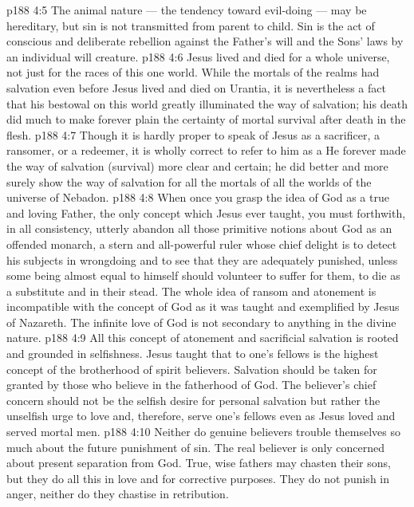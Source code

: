 \vs p188 4:5 The animal nature --- the tendency toward evil\hyp{}doing --- may be hereditary, but sin is not transmitted from parent to child. Sin is the act of conscious and deliberate rebellion against the Father’s will and the Sons’ laws by an individual will creature.
\vs p188 4:6 Jesus lived and died for a whole universe, not just for the races of this one world. While the mortals of the realms had salvation even before Jesus lived and died on Urantia, it is nevertheless a fact that his bestowal on this world greatly illuminated the way of salvation; his death did much to make forever plain the certainty of mortal survival after death in the flesh.
\vs p188 4:7 Though it is hardly proper to speak of Jesus as a sacrificer, a ransomer, or a redeemer, it is wholly correct to refer to him as a  He forever made the way of salvation (survival) more clear and certain; he did better and more surely show the way of salvation for all the mortals of all the worlds of the universe of Nebadon.
\vs p188 4:8 When once you grasp the idea of God as a true and loving Father, the only concept which Jesus ever taught, you must forthwith, in all consistency, utterly abandon all those primitive notions about God as an offended monarch, a stern and all\hyp{}powerful ruler whose chief delight is to detect his subjects in wrongdoing and to see that they are adequately punished, unless some being almost equal to himself should volunteer to suffer for them, to die as a substitute and in their stead. The whole idea of ransom and atonement is incompatible with the concept of God as it was taught and exemplified by Jesus of Nazareth. The infinite love of God is not secondary to anything in the divine nature.
\vs p188 4:9 All this concept of atonement and sacrificial salvation is rooted and grounded in selfishness. Jesus taught that  to one’s fellows is the highest concept of the brotherhood of spirit believers. Salvation should be taken for granted by those who believe in the fatherhood of God. The believer’s chief concern should not be the selfish desire for personal salvation but rather the unselfish urge to love and, therefore, serve one’s fellows even as Jesus loved and served mortal men.
\vs p188 4:10 Neither do genuine believers trouble themselves so much about the future punishment of sin. The real believer is only concerned about present separation from God. True, wise fathers may chasten their sons, but they do all this in love and for corrective purposes. They do not punish in anger, neither do they chastise in retribution.

